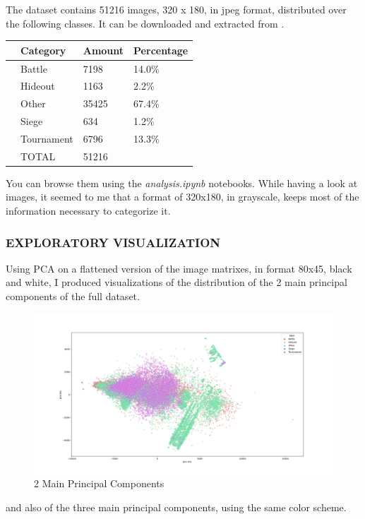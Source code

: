 \documentclass[
]{article}
\newcommand{\hhref}[3][blue]{\href{#2}{\color{#1}{#3}}}%
\begin{document}
The dataset contains 51216 images, 320 x 180, in jpeg format,
distributed over the following classes. It can be downloaded and extracted from \hhref{https://da-youtube-ml.s3.eu-central-1.amazonaws.com/wendy-cnn/frames/wendy_cnn_frames_data_5.zip}{this zip file on S3}.

\begin{longtable}[]{@{}llll@{}}
\toprule
& Category & Amount & Percentage\tabularnewline
\midrule
\endhead
& Battle & 7198 & 14.0\%\tabularnewline
& Hideout & 1163 & 2.2\%\tabularnewline
& Other & 35425 & 67.4\%\tabularnewline
& Siege & 634 & 1.2\%\tabularnewline
& Tournament & 6796 & 13.3\%\tabularnewline
& TOTAL & 51216 &\tabularnewline
\bottomrule
\end{longtable}

You can browse them using the \emph{analysis.ipynb} notebooks. While
having a look at images, it seemed to me that a format of 320x180, in
grayscale, keeps most of the information necessary to categorize it. 

\hypertarget{exploratory-visualization}{%
\subsubsection{EXPLORATORY
VISUALIZATION}\label{exploratory-visualization}}

Using PCA on a flattened version of the image matrixes, in format 80x45,
black and white, I produced visualizations of the distribution of the 2 main principal components of the full dataset. 

\begin{figure}[H]
\centering
\includegraphics{visualizations/pca_sklearn_2d_80_45_L.png}
\caption{2 Main Principal Components}
\end{figure}

and also of the three main principal components, using the same color scheme.
\end{document}
